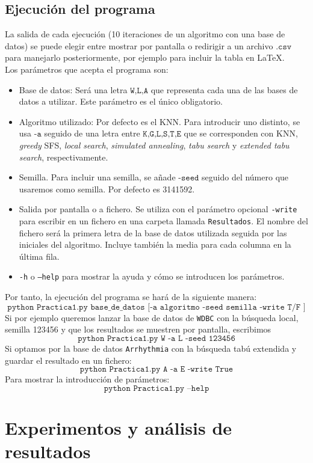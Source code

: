 \documentclass[11pt,leqno]{article}
\begin{document}
\subsection{Ejecución del programa}
La salida de cada ejecución (10 iteraciones de un algoritmo con una base de datos) se puede elegir entre mostrar por pantalla o redirigir a un archivo $\texttt{.csv}$ para manejarlo posteriormente, por ejemplo para incluir la tabla en \LaTeX.\\
Los parámetros que acepta el programa son:
\begin{itemize}
\item Base de datos: Será una letra $\texttt{W,L,A}$ que representa cada una de las bases de datos a utilizar. Este parámetro es el único obligatorio.
\item Algoritmo utilizado: Por defecto es el KNN. Para introducir uno distinto, se usa $\texttt{-a}$ seguido de una letra entre $\texttt{K,G,L,S,T,E}$ que se corresponden con KNN, \textit{greedy} SFS, \textit{local search}, \textit{simulated annealing}, \textit{tabu search} y \textit{extended tabu search}, respectivamente.
\item Semilla. Para incluir una semilla, se añade $\texttt{-seed}$ seguido del número que usaremos como semilla. Por defecto es 3141592.
\item Salida por pantalla o a fichero. Se utiliza con el parámetro opcional \texttt{-write} para escribir en un fichero en una carpeta llamada \texttt{Resultados}. El nombre del fichero será la primera letra de la base de datos utilizada seguida por las iniciales del algoritmo. Incluye también la media para cada columna en la última fila.
\item \texttt{-h} o \texttt{--help} para mostrar la ayuda y cómo se introducen los parámetros.
\end{itemize}
Por tanto, la ejecución del programa se hará de la siguiente manera:
\[ \texttt{python Practica1.py base\_de\_datos [-a algoritmo -seed semilla -write T/F ]} \]
Si por ejemplo queremos lanzar la base de datos de \texttt{WDBC} con la búsqueda local, semilla 123456 y que los resultados se muestren por pantalla, escribimos
\[ \texttt{python Practica1.py W -a L -seed 123456}\]
Si optamos por la base de datos \texttt{Arrhythmia} con la búsqueda tabú extendida y guardar el resultado en un fichero:
\[ \texttt{python Practica1.py A -a E -write True}\]
Para mostrar la introducción de parámetros:
\[ \texttt{python Practica1.py --help}\]

\section{Experimentos y análisis de resultados}
\end{document}
